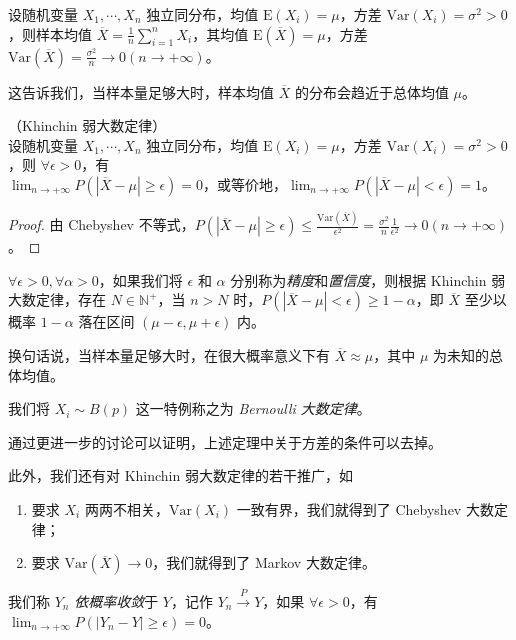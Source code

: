 \documentclass[../main.tex]{subfiles}
\begin{document}
设随机变量 $X_1,\cdots,X_n$ 独立同分布，均值 $\mathrm E(X_i)=\mu$，方差 $\mathrm{Var}(X_i)=\sigma^2>0$，则样本均值 $\overline X=\frac1n\sum_{i=1}^nX_i$，其均值 $\mathrm E(\overline X)=\mu$，方差 $\mathrm{Var}(\overline X)=\frac{\sigma^2}n\rightarrow0(n\rightarrow+\infty)$。

这告诉我们，当样本量足够大时，样本均值 $\overline X$ 的分布会趋近于总体均值 $\mu$。

\begin{theorem}\label{thm:5.2.1}
    （Khinchin 弱大数定律）\\
    设随机变量 $X_1,\cdots,X_n$ 独立同分布，均值 $\mathrm E(X_i)=\mu$，方差 $\mathrm{Var}(X_i)=\sigma^2>0$，则 $\forall\epsilon>0$，有\\
    $\lim_{n\rightarrow+\infty}P(|\overline X-\mu|\geq\epsilon)=0$，或等价地，$\lim_{n\rightarrow+\infty}P(|\overline X-\mu|<\epsilon)=1$。
\end{theorem}

\begin{proof}
    由 Chebyshev 不等式，$P(|\overline X-\mu|\geq\epsilon)\leq\frac{\mathrm{Var}(\overline X)}{\epsilon^2}=\frac{\sigma^2}n\frac1{\epsilon^2}\rightarrow0(n\rightarrow+\infty)$。
\end{proof}

$\forall\epsilon>0,\forall\alpha>0$，如果我们将 $\epsilon$ 和 $\alpha$ 分别称为\emph{精度}和\emph{置信度}，则根据 Khinchin 弱大数定律，存在 $N\in\mathbb N^+$，当 $n>N$ 时，$P(|\overline X-\mu|<\epsilon)\geq1-\alpha$，即 $\overline X$ 至少以概率 $1-\alpha$ 落在区间 $(\mu-\epsilon,\mu+\epsilon)$ 内。

换句话说，当样本量足够大时，在很大概率意义下有 $\overline X\approx\mu$，其中 $\mu$ 为未知的总体均值。

我们将 $X_i\sim B(p)$ 这一特例称之为 \emph{Bernoulli 大数定律}。

通过更进一步的讨论可以证明，上述定理中关于方差的条件可以去掉。

此外，我们还有对 Khinchin 弱大数定律的若干推广，如
\begin{enumerate}
    \item 要求 $X_i$ 两两不相关，$\mathrm{Var}(X_i)$ 一致有界，我们就得到了 Chebyshev 大数定律；
    \item 要求 $\mathrm{Var}(\overline X)\rightarrow0$，我们就得到了 Markov 大数定律。
\end{enumerate}

\begin{definition}\label{def:5.2.1}
    我们称 $Y_n$ \emph{依概率收敛}于 $Y$，记作 $Y_n\overset{P}{\rightarrow}Y$，如果 $\forall\epsilon>0$，有 $\lim_{n\rightarrow+\infty}P(|Y_n-Y|\geq\epsilon)=0$。
\end{definition}
\end{document}
